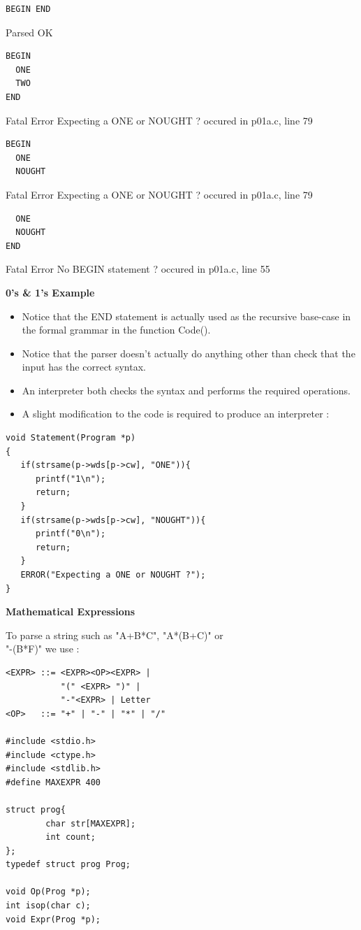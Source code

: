 \documentclass[a4,portraitt]{slides}
\begin{document}
{{{{\bf \begin{verbatim}
BEGIN END
\end{verbatim} }
\vspace*{-1.5ex}
Parsed OK

{\bf \begin{verbatim}
BEGIN
  ONE
  TWO
END
\end{verbatim} }
\vspace*{-1.5ex}
Fatal Error Expecting a ONE or NOUGHT ?
occured in p01a.c, line 79

{\bf \begin{verbatim}
BEGIN
  ONE
  NOUGHT
\end{verbatim} }
\vspace*{-1.5ex}
Fatal Error Expecting a ONE or NOUGHT ?
occured in p01a.c, line 79

{\bf \begin{verbatim}
  ONE
  NOUGHT
END
\end{verbatim} }
\vspace*{-1.5ex}
Fatal Error No BEGIN statement ?
occured in p01a.c, line 55
}}

\newpage
{\samepage
\begin{center}
{\Large{\bf 0's \& 1's Example}}
\end{center}
{\small
\begin{itemize}
\item Notice that the END statement is actually used as the recursive base-case in the formal grammar in the function Code().
\item Notice that the parser doesn't actually do anything other than check that the input has the correct syntax.
\item An interpreter both checks the syntax and performs the required operations.
\item A slight modification to the code is required to produce an interpreter :
\end{itemize}
\begin{verbatim}
void Statement(Program *p)
{
   if(strsame(p->wds[p->cw], "ONE")){
      printf("1\n");
      return;
   }
   if(strsame(p->wds[p->cw], "NOUGHT")){
      printf("0\n");
      return;
   }
   ERROR("Expecting a ONE or NOUGHT ?");
}
\end{verbatim}
}}

\newpage
{\samepage
\begin{center}
{\Large{\bf Mathematical Expressions}}
\end{center}
To parse a string such as  "A+B*C", "A*(B+C)" or\\
"-(B*F)" we use :
\begin{verbatim}
<EXPR> ::= <EXPR><OP><EXPR> |
           "(" <EXPR> ")" |
           "-"<EXPR> | Letter
<OP>   ::= "+" | "-" | "*" | "/"

#include <stdio.h>
#include <ctype.h>
#include <stdlib.h>
#define MAXEXPR 400

struct prog{
        char str[MAXEXPR];
        int count;
};
typedef struct prog Prog;

void Op(Prog *p);
int isop(char c);
void Expr(Prog *p);
\end{verbatim}
}}
\end{document}
